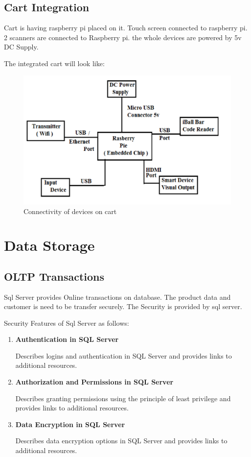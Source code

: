\documentclass[a4paper,oneside,11pt,english]{report}
\begin{document}
	\subsection{Cart Integration}
		\par Cart is having raspberry pi placed on it. Touch screen connected to raspberry pi. 2 scanners are connected to Raspberry pi. the whole devices are powered by 5v DC Supply.
		\par The integrated cart will look like:\\ 
		\begin{figure}[ht!]
			\includegraphics[width=\linewidth]{images/innercart.png}
			\caption{Connectivity of devices on cart}
		\end{figure}
\section{Data Storage}
	\subsection{OLTP Transactions}
		\par Sql Server provides Online transactions on database. The product data and customer is need to be transfer securely. 
		The Security is provided by sql server.
		\par Security Features of Sql Server as follows:\\
			\begin{enumerate}
				\item {
					\textbf{Authentication in SQL Server}
					\par Describes logins and authentication in SQL Server and provides links to additional resources.
				}
				\item {
					\textbf{Authorization and Permissions in SQL 	Server}
					\par Describes granting permissions using the principle of least privilege and provides links to additional resources.
				}
				\item {
					\textbf{Data Encryption in SQL Server}
					\par Describes data encryption options in SQL Server and provides links to additional resources.
				}
			\end{enumerate}
\end{document}
